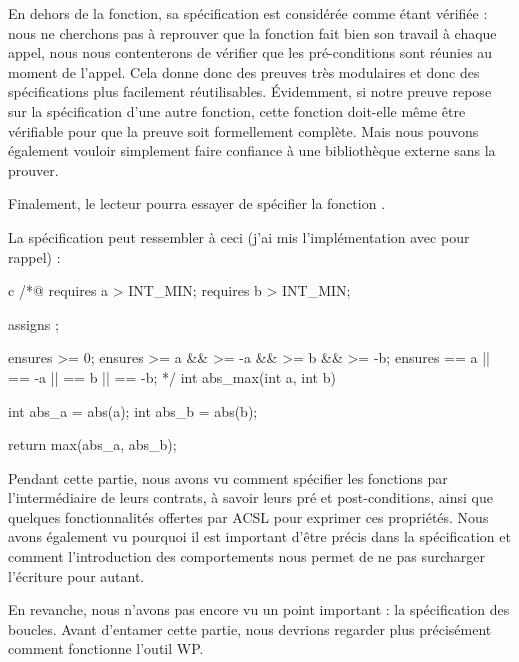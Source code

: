 \documentclass[middle]{zmdocument}
\begin{document}
En dehors de la fonction, sa spécification est considérée comme étant 
vérifiée : nous ne cherchons pas à reprouver que la fonction fait bien son travail
à chaque appel, nous nous contenterons de vérifier que les pré-conditions sont 
réunies au moment de l'appel. Cela donne donc des preuves très modulaires et donc 
des spécifications plus facilement réutilisables. Évidemment, si notre preuve 
repose sur la spécification d'une autre fonction, cette fonction doit-elle même 
être vérifiable pour que la preuve soit formellement complète. Mais nous pouvons
également vouloir simplement faire confiance à une bibliothèque externe sans la
prouver.



Finalement, le lecteur pourra essayer de spécifier la fonction .



La spécification peut ressembler à ceci (j'ai mis l'implémentation avec pour
rappel) :



\begin{CodeBlock}{c}
/*@
  requires a > INT_MIN;
  requires b > INT_MIN;

  assigns \nothing;

  ensures \result >= 0;
  ensures \result >= a && \result >= -a && \result >= b && \result >= -b;
  ensures \result == a || \result == -a || \result == b || \result == -b;
*/
int abs_max(int a, int b){
  int abs_a = abs(a);
  int abs_b = abs(b);

  return max(abs_a, abs_b);
}
\end{CodeBlock}



\horizontalLine



Pendant cette partie, nous avons vu comment spécifier les fonctions par 
l'intermédiaire de leurs contrats, à savoir leurs pré et post-conditions, ainsi
que quelques fonctionnalités offertes par ACSL pour exprimer ces propriétés. 
Nous avons également vu pourquoi il est important d'être précis dans la 
spécification et comment l'introduction des comportements nous permet de ne pas
surcharger l'écriture pour autant.



En revanche, nous n'avons pas encore vu un point important : la spécification 
des boucles. Avant d'entamer cette partie, nous devrions regarder plus 
précisément comment fonctionne l'outil WP.
\end{document}
